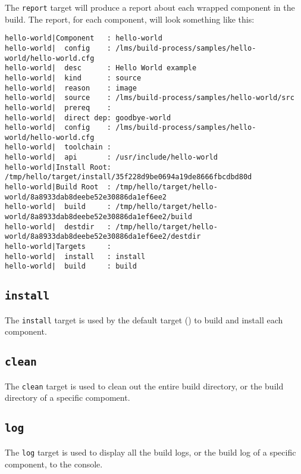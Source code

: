 The \texttt{report} target will produce a report about each wrapped
component in the build.  The report, for each component, will look
something like this:

\begin{footnotesize}
\begin{verbatim}
hello-world|Component   : hello-world
hello-world|  config    : /lms/build-process/samples/hello-world/hello-world.cfg
hello-world|  desc      : Hello World example
hello-world|  kind      : source
hello-world|  reason    : image
hello-world|  source    : /lms/build-process/samples/hello-world/src
hello-world|  prereq    :
hello-world|  direct dep: goodbye-world
hello-world|  config    : /lms/build-process/samples/hello-world/hello-world.cfg
hello-world|  toolchain :
hello-world|  api       : /usr/include/hello-world
hello-world|Install Root: /tmp/hello/target/install/35f228d9be0694a19de8666fbcdbd80d
hello-world|Build Root  : /tmp/hello/target/hello-world/8a8933dab8deebe52e30886da1ef6ee2
hello-world|  build     : /tmp/hello/target/hello-world/8a8933dab8deebe52e30886da1ef6ee2/build
hello-world|  destdir   : /tmp/hello/target/hello-world/8a8933dab8deebe52e30886da1ef6ee2/destdir
hello-world|Targets     :
hello-world|  install   : install
hello-world|  build     : build
\end{verbatim}
\end{footnotesize}

\subsection{\texttt{install}}

The \texttt{install} target is used by the default target
() to build and install each component.

\subsection{\texttt{clean}}

The \texttt{clean} target is used to clean out the entire build
directory, or the build directory of a specific compoment.

\subsection{\texttt{log}}

The \texttt{log} target is used to display all the build logs, or the
build log of a specific component, to the console.

